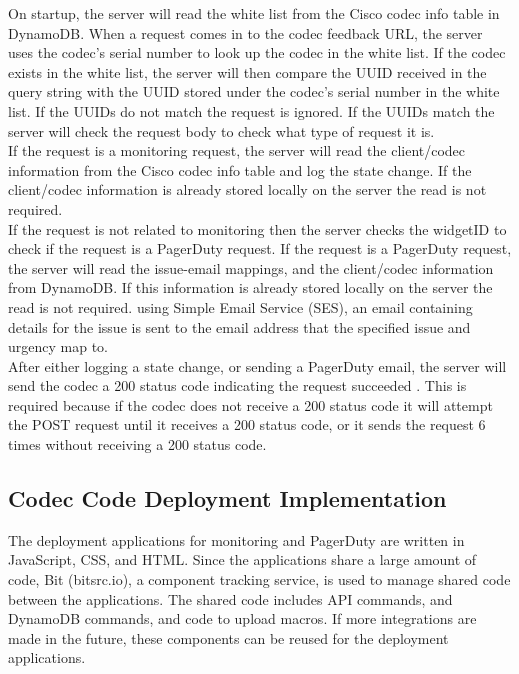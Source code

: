 \documentclass[letterpaper,12pt]{article}
\begin{document}
On startup, the server will read the white list from the Cisco codec info table in DynamoDB. When a request comes in to the codec feedback URL, the server uses the codec's serial number to look up the codec in the white list. If the codec exists in the white list, the server will then compare the UUID received in the query string with the UUID stored under the codec's serial number in the white list. If the UUIDs do not match the request is ignored. If the UUIDs match the server will check the request body to check what type of request it is.\\

If the request is a monitoring request, the server will read the client/codec information from the Cisco codec info table and log the state change. If the client/codec information is already stored locally on the server the read is not required.\\

If the request is not related to monitoring then the server checks the widgetID to check if the request is a PagerDuty request. If the request is a PagerDuty request, the server will read the issue-email mappings, and the client/codec information from DynamoDB. If this information is already stored locally on the server the read is not required. using Simple Email Service (SES), an email containing details for the issue is sent to the email address that the specified issue and urgency map to.\\

After either logging a state change, or sending a PagerDuty email, the server will send the codec a 200 status code indicating the request succeeded \cite{statuscode}. This is required because if the codec does not receive a 200 status code it will attempt the POST request until it receives a 200 status code, or it sends the request 6 times without receiving a 200 status code.

\subsection{Codec Code Deployment Implementation}
The deployment applications for monitoring and PagerDuty are written in JavaScript, CSS, and HTML. Since the applications share a large amount of code, Bit (bitsrc.io), a component tracking service, is used to manage shared code between the applications. The shared code includes API commands, and DynamoDB commands, and code to upload macros. If more integrations are made in the future, these components can be reused for the deployment applications.\\
\end{document}
